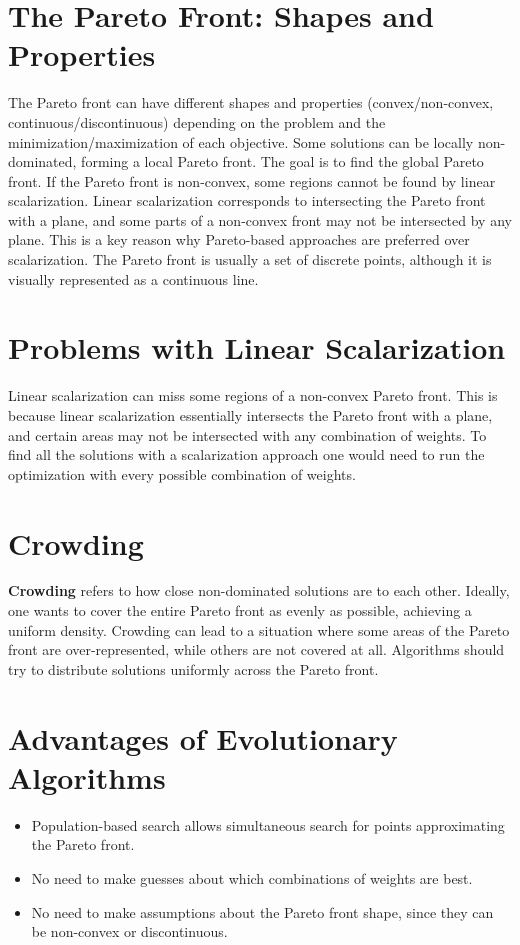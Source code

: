 \section{The Pareto Front: Shapes and Properties}

The Pareto front can have different shapes and properties (convex/non-convex, continuous/discontinuous) depending on the problem and the minimization/maximization of each objective.
Some solutions can be locally non-dominated, forming a local Pareto front. The goal is to find the global Pareto front.  If the Pareto front is non-convex, some regions cannot be found by linear scalarization. Linear scalarization corresponds to intersecting the Pareto front with a plane, and some parts of a non-convex front may not be intersected by any plane. This is a key reason why Pareto-based approaches are preferred over scalarization.
The Pareto front is usually a set of discrete points, although it is visually represented as a continuous line.

\section{Problems with Linear Scalarization}
Linear scalarization can miss some regions of a non-convex Pareto front.
This is because linear scalarization essentially intersects the Pareto front with a plane, and certain areas may not be intersected with any combination of weights.  To find all the solutions with a scalarization approach one would need to run the optimization with every possible combination of weights.

\section{Crowding}

\textbf{Crowding} refers to how close non-dominated solutions are to each other.  Ideally, one wants to cover the entire Pareto front as evenly as possible, achieving a uniform density.  Crowding can lead to a situation where some areas of the Pareto front are over-represented, while others are not covered at all.  Algorithms should try to distribute solutions uniformly across the Pareto front.

\section{Advantages of Evolutionary Algorithms}
\begin{itemize}
    \item Population-based search allows simultaneous search for points approximating the Pareto front.
    \item No need to make guesses about which combinations of weights are best.
     \item No need to make assumptions about the Pareto front shape, since they can be non-convex or discontinuous.
\end{itemize}


